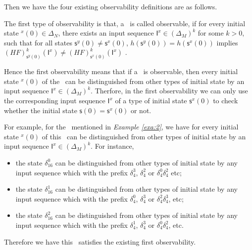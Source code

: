 Then we have the four existing observability definitions are as follows.

\begin{definition} 
The first type of observability is that, a \BCN\ is called observable, if for every initial state \State$^{x}(0)$$\in \Delta_N$, there exists an input sequence $\mathsf{I}^x\in(\Delta_M)^k$ for some $k>0$, such that for all states $\mathsf{s}^{y}(0)\neq \mathsf{s}^{x}(0)$, $h(\mathsf{s}^{y}(0))=h(\mathsf{s}^{x}(0))$ implies $(HF)^k_{\mathsf{s}^{y}(0)}(\mathsf{I}^x)\neq (HF)^k_{{\mathsf{s}^{x}(0)}}(\mathsf{I}^x)$ \cite{cheng2009controllability}.
\end{definition}

Hence the first observability means that if a \BCN\ is observable, then every initial state \State$^{x}(0)$ of the \BCN\ can be distinguished from other types of initial state by an input sequence $\mathsf{I}^x \in(\Delta_M)^k$. Therfore, in the first observability we can only use the corresponding input sequence $\mathsf{I}^x$ of a type of initial state $\mathsf{s}^{x}(0)$ to check whether the initial state $\mathsf{s}(0)=\mathsf{s}^{x}(0)$ or not. 
\begin{example}
For example, for the \BCN\ mentioned in {\em Example \ref{exa:2}}, we have for every initial state \State$^{x}(0)$ of this \BCN\ can be distinguished from other types of initial state by an input sequence $\mathsf{I}^x \in(\Delta_M)^k$.  For instance,
\begin{itemize}
  \item the state $\delta_{16}^0$ can be distinguished from other types of initial state by any input sequence which with the prefix $\delta_{4}^3$, $\delta_{4}^2$ or $\delta_{4}^0  \delta_{4}^2$  etc;
  \item the state $\delta_{16}^1$ can be distinguished from other types of initial state by any input sequence which with the prefix $\delta_{4}^0$, $\delta_{4}^3$ or $\delta_{4}^2 \delta_{4}^3$, etc;
  \item the state $\delta_{16}^2$ can be distinguished from other types of initial state by any input sequence which with the prefix $\delta_{4}^1$, $\delta_{4}^3$ or $\delta_{4}^0 \delta_{4}^2$, etc.
\end{itemize} 

Therefore we have this \BCN\ satisfies the existing first observability.
\label{exa:4}
\end{example}   

